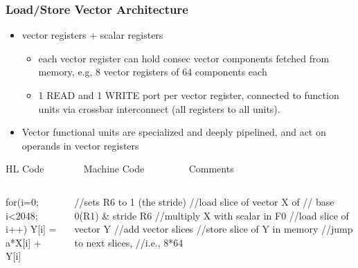 \documentclass{beamer}
\begin{document}
\begin{frame}[fragile,t]
\frametitle{Load/Store Vector Architecture}

\begin{itemize}
    \item vector registers + scalar registers
    \begin{itemize}
        \item each vector register can hold consec vector components
                fetched from memory, 
                e.g, 8 vector registers of 64 components each
        \item 1 READ and 1 WRITE port per vector register, 
                connected to function units via crossbar interconnect
                (all registers to all units).
    \end  {itemize}\medskip

    \item Vector functional units are specialized and deeply pipelined, and
            act on operands in vector registers
\end  {itemize}

\begin{block}{HL Code{\tt~~~~~~~~}Machine Code{\tt~~~~~~~~~}Comments}
\begin{columns}
\begin{colorcode}[fontsize=\scriptsize]
for(i=0; i<2048; i++)
  Y[i] = a*X[i] + Y[i]
\end{colorcode} 
\begin{colorcode}[fontsize=\scriptsize]
//sets R6 to 1 (the stride)
//load slice of vector X of  
//  base 0(R1) \& stride R6  
//multiply X with scalar in F0 
//load slice of vector Y
//add vector slices 
//store slice of Y in memory
//jump to next slices, 
//i.e., 8*64


\end{colorcode} 
\end{columns}
\end{block}

\end{frame}
\end{document}
